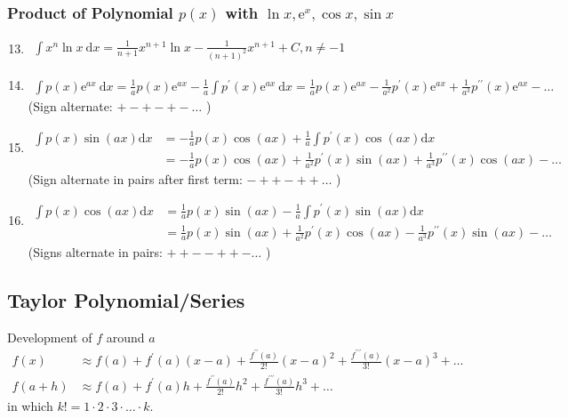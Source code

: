 \subsubsection{Product of Polynomial $p(x)$ with $\ln x, \mathrm{e}^{x}, \cos x, \sin x$}
 \begin{enumerate}
    \setcounter{enumi}{12}
    \item $\begin{aligned} 
        \int x^{n} \ln x \mathrm{~d} x=\frac{1}{n+1} x^{n+1} \ln x-\frac{1}{(n+1)^{2}} x^{n+1}+C, n \neq-1\end{aligned}$
    \item $\begin{aligned} 
        \int p(x) \mathrm{e}^{a x} \mathrm{~d} x=\frac{1}{a} p(x) \mathrm{e}^{a x}-\frac{1}{a} \int p^{\prime}(x) \mathrm{e}^{a x} \mathrm{~d} x=\frac{1}{a} p(x) \mathrm{e}^{a x}-\frac{1}{a^{2}} p^{\prime}(x) \mathrm{e}^{a x}+\frac{1}{a^{3}} p^{\prime \prime}(x) \mathrm{e}^{a x}-\ldots\end{aligned}$\newline
        (Sign alternate: $+-+-+-\ldots$ )
    \item $\begin{aligned}
        \int p(x) \sin (a x) \mathrm{d} x&=-\frac{1}{a} p(x) \cos (a x)+\frac{1}{a} \int p^{\prime}(x) \cos (a x) \mathrm{d} x\\ &=-\frac{1}{a} p(x) \cos (a x)+\frac{1}{a^{2}} p^{\prime}(x) \sin (a x)+\frac{1}{a^{3}} p^{\prime \prime}(x) \cos (a x)-\ldots 
        \end{aligned}$\newline 
        (Sign alternate in pairs after first term: $-++-++\ldots$ )
    \item $\begin{aligned}
        \int p(x) \cos (a x) \mathrm{d} x&=\frac{1}{a} p(x) \sin (a x)-\frac{1}{a} \int p^{\prime}(x) \sin (a x) \mathrm{d} x\\
        &=\frac{1}{a} p(x) \sin (a x)+\frac{1}{a^{2}} p^{\prime}(x) \cos (a x)-\frac{1}{a^{3}} p^{\prime \prime}(x) \sin (a x)-\ldots
    \end{aligned}$\newline
    (Signs alternate in pairs: $++--++-\ldots$ )
 \end{enumerate}

\subsection{Taylor Polynomial/Series}
Development of $f$ around $a$
$$
\begin{aligned}
f(x) & \approx f(a)+f^{\prime}(a)(x-a)+\frac{f^{\prime \prime}(a)}{2 !}(x-a)^{2}+\frac{f^{\prime \prime \prime}(a)}{3 !}(x-a)^{3}+\ldots \\
f(a+h) & \approx f(a)+f^{\prime}(a) h+\frac{f^{\prime \prime}(a)}{2 !} h^{2}+\frac{f^{\prime \prime \prime}(a)}{3 !} h^{3}+\ldots
\end{aligned}
$$
in which $k !=1 \cdot 2 \cdot 3 \cdot \ldots \cdot k$.
